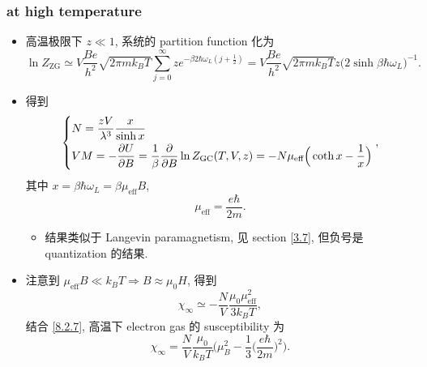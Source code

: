 \subsubsection{at high temperature}
\begin{itemize}
	\item 高温极限下 $z \ll 1$, 系统的 partition function 化为
	\begin{equation}
		\ln Z_\text{ZG} \simeq V \frac{B e}{h^2} \sqrt{2 \pi m k_B T} \sum_{j = 0}^\infty z e^{- \beta 2 \hbar \omega_L (j + \frac{1}{2})} = V \frac{B e}{h^2} \sqrt{2 \pi m k_B T} z \Big( 2 \sinh \beta \hbar \omega_L \Big)^{- 1}.
	\end{equation}
	
	\item 得到
	\begin{equation}
		\begin{dcases}
			N = \frac{z V}{\lambda^3} \frac{x}{\sinh x} \\
			V M = - \frac{\partial U}{\partial B} = \frac{1}{\beta} \frac{\partial}{\partial B} \ln Z_\text{GC}(T, V, z) = - N \mu_\text{eff} \Big( \coth x - \frac{1}{x} \Big)
		\end{dcases},
	\end{equation}
	其中 $x = \beta \hbar \omega_L = \beta \mu_\text{eff} B$,
	\begin{equation}
		\mu_\text{eff} = \frac{e \hbar}{2 m}.
	\end{equation}
	\begin{itemize}
		\item 结果类似于 Langevin paramagnetism, 见 section \ref{3.7}, 但负号是 quantization 的结果.
	\end{itemize}
	
	\item 注意到 $\mu_\text{eff} B \ll k_B T \Longrightarrow B \approx \mu_0 H$, 得到
	\begin{equation}
		\boxed{\chi_\infty \simeq - \frac{N}{V} \frac{\mu_0 \mu_\text{eff}^2}{3 k_B T}},
	\end{equation}
	结合 \eqref{8.2.7}, 高温下 electron gas 的 susceptibility 为
	\begin{equation}
		\chi_\infty = \frac{N}{V} \frac{\mu_0}{k_B T} \Big( \mu_B^2 - \frac{1}{3} \Big( \frac{e \hbar}{2 m} \Big)^2 \Big).
	\end{equation}
\end{itemize}

